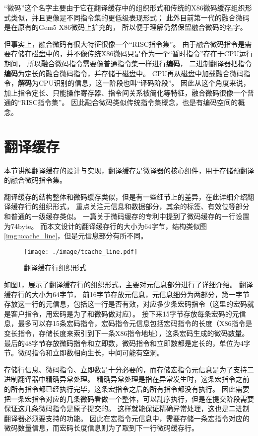 “微码”这个名字主要由于它在翻译缓存中的组织形式和传统的X86微码缓存组织形式类似，并且更像是不同指令集的更低级表现形式；
此外目前第一代的融合微码是在原有的Gem5 X86微码上扩充的，
所以便于理解仍然保留融合微码的名字。

但事实上，融合微码有很大特征很像一个“RISC指令集”。
由于融合微码指令是需要存储在磁盘中的，并不像传统X86微码只是作为一个“暂时指令”存在于CPU运行期间，
所以融合微码指令需要像普通指令集一样进行\textbf{编码}，
二进制翻译器把指令\textbf{编码}为定长的融合微码指令，并存储于磁盘中。
CPU再从磁盘中加载融合微码指令，\textbf{解码}为CPU识别的信息，这一阶段也叫“译码阶段”。
因此从这个角度来说，加上指令定长、只能操作寄存器、指令间关系被简化等特征，融合微码很像一个普通的“RISC指令集”。
因此融合微码类似传统指令集概念，也是有编码空间的概念。

\section{翻译缓存}\label{sec:tcache}

本节讲解翻译缓存的设计与实现，翻译缓存是微译器的核心组件，用于存储预翻译的融合微码指令集。

翻译缓存的结构整体和微码缓存类似，但是有一些细节上的差异，在此详细介绍翻译缓存行的组织形式，
重点关注元信息和数据部分，其余的标签、有效位等部分和普通的一级缓存类似。
一篇关于微码缓存的专利\cite{uopPatent}中提到了微码缓存的一行设置为74byte。
而本文设计的翻译缓存行的大小为64字节，结构类似图\ref{img:ucache_line}，但是元信息部分有所不同。

\begin{figure}[!htbp]
  \centering
  \texttt{[image: ./image/tcache\_line.pdf]}
  \caption{翻译缓存行组织形式}
  \label{img:tcache_line}
\end{figure}

如图\ref{img:tcache_line}，展示了翻译缓存行的组织形式，主要对元信息部分进行了详细介绍。
翻译缓存行的大小为64字节，
前16字节存放元信息，元信息细分为两部分，第一字节存放这一行的元信息，包括这一行是否有效，对应多少条宏码指令（这里的宏码就是客户指令，用宏码是为了和微码做对应）。
接下来15字节存放每条宏码的元信息，最多可以存15条宏码指令，宏码指令元信息包括宏码指令的长度（X86指令是变长指令，存储长度来索引到下一条X86指令地址），这条宏码生成的微码数量。
最后的48字节存放微码指令和立即数，微码指令和立即数都是定长的，单位为4字节。微码指令和立即数相向生长，中间可能有空洞。

存储行信息、微码指令、立即数是十分必要的，而存储宏指令元信息是为了支持二进制翻译器中精确异常处理。
精确异常处理是指在异常发生时，这条宏指令之前的所有指令都已经执行完毕，这条宏指令之后的所有指令都没有执行。
因此需要把一条宏指令对应的几条微码看做一个整体，可以乱序执行，但是在提交阶段需要保证这几条微码指令是原子提交的。
这样就能保证精确异常处理，这也是二进制翻译器必须要支持的功能。
因此在宏指令元信息中，需要存储一条宏指令对应的微码数量信息，而宏码长度信息则为了取到下一行微码缓存行。



